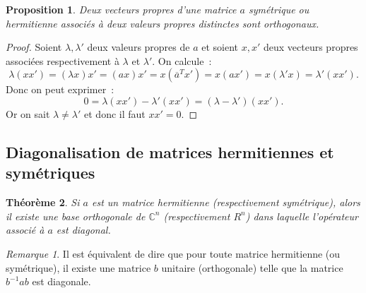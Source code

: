 \documentclass{article}
\newcommand{\C}{\mathbb C}
\newcommand{\conj}[1]{\overline {#1}}
\newtheorem{thm}{Théorème}[section]
\newtheorem{prp}[thm]{Proposition}
\theoremstyle{definition}
\theoremstyle{remark}
\newtheorem*{rmq}{Remarque}
\begin{document}
		\begin{prp} Deux vecteurs propres d'une matrice $a$ symétrique ou hermitienne associés à deux valeurs propres distinctes sont orthogonaux.
		\end{prp}

		\begin{proof} Soient $\lambda, \lambda'$ deux valeurs propres de $a$ et soient $x, x'$ deux vecteurs propres associées respectivement à $\lambda$ et
		$\lambda'$. On calcule~:
		\[\lambda (xx') = (\lambda x)x' = (ax)x' = x(\conj a^Tx') = x(ax') = x(\lambda' x) = \lambda'(xx').\]
		Donc on peut exprimer~:
		\[0 = \lambda (xx') - \lambda'(xx') = (\lambda-\lambda')(xx').\]
		Or on sait $\lambda \neq \lambda'$ et donc il faut $xx' = 0$.
		\end{proof}

	\subsection{Diagonalisation de matrices hermitiennes et symétriques}
		\begin{thm} Si $a$ est un matrice hermitienne (respectivement symétrique), alors il existe une base orthogonale de $\C^n$ (respectivement $R^n$) dans
		laquelle l'opérateur associé à $a$ est diagonal.
		\end{thm}

		\begin{rmq} Il est équivalent de dire que pour toute matrice hermitienne (ou symétrique), il existe une matrice $b$ unitaire (orthogonale) telle que
		la matrice $b^{-1}ab$ est diagonale.
		\end{rmq}
\end{document}
